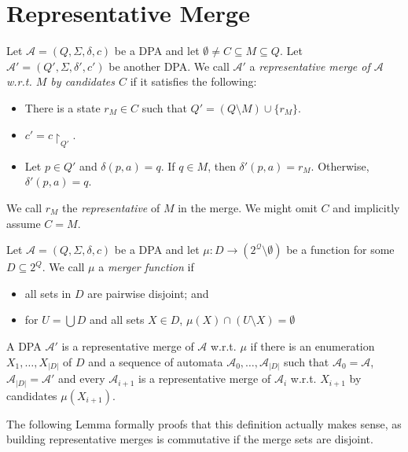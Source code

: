 \section{Representative Merge}

\begin{defn}
	Let $\mathcal{A} = (Q, \Sigma, \delta, c)$ be a DPA and let $\emptyset \neq C \subseteq M \subseteq Q$. Let $\mathcal{A}' = (Q', \Sigma, \delta', c')$ be another DPA. We call $\mathcal{A}'$ a \emph{representative merge of $\mathcal{A}$ w.r.t. $M$ by candidates $C$} if it satisfies the following:
	\begin{itemize}
		\item There is a state $r_M \in C$ such that $Q' = (Q \setminus M) \cup \{r_M\}$.
		\item $c' = c\upharpoonright_{Q'}$.
		\item Let $p \in Q'$ and $\delta(p, a) = q$. If $q \in M $, then $\delta'(p, a) = r_M$. Otherwise, $\delta'(p, a) = q$. 
	\end{itemize}
	
	We call $r_M$ the \emph{representative} of $M$ in the merge. We might omit $C$ and implicitly assume $C = M$.
\end{defn}

\begin{defn}
	Let $\mathcal{A} = (Q, \Sigma, \delta, c)$ be a DPA and let $\mu : D \rightarrow (2^\mathcal{Q} \setminus \emptyset)$ be a function for some $D \subseteq 2^Q$. We call $\mu$ a \emph{merger function} if 
	\begin{itemize}
		\item all sets in $D$ are pairwise disjoint; and
		\item for $U = \bigcup D$ and all sets $X \in D$, $\mu(X) \cap (U \setminus X) = \emptyset$
	\end{itemize}
	
	A DPA $\mathcal{A}'$ is a representative merge of $\mathcal{A}$ w.r.t. $\mu$ if there is an enumeration $X_1, \dots, X_{|D|}$ of $D$ and a sequence of automata $\mathcal{A}_0, \dots, \mathcal{A}_{|D|}$ such that $\mathcal{A}_0 = \mathcal{A}$, $\mathcal{A}_{|D|} = \mathcal{A}'$ and every $\mathcal{A}_{i+1}$ is a representative merge of $\mathcal{A}_i$ w.r.t. $X_{i+1}$ by candidates $\mu(X_{i+1})$.
\end{defn}

\vspace{5pt}

The following Lemma formally proofs that this definition actually makes sense, as building representative merges is commutative if the merge sets are disjoint.

